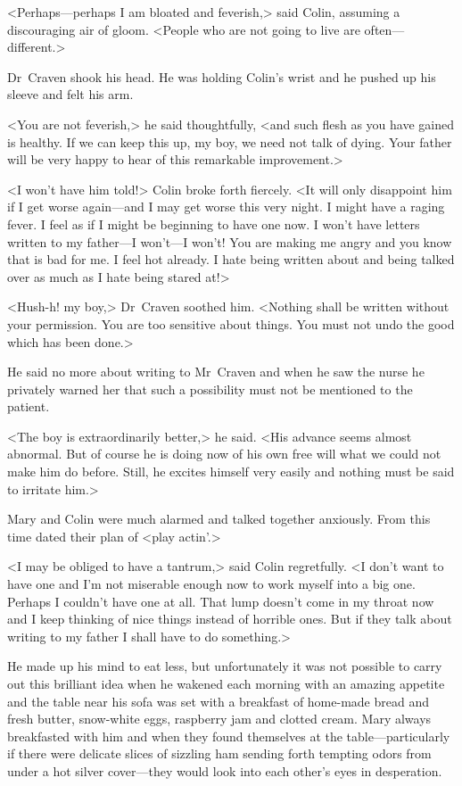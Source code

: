 <Perhaps—perhaps I am bloated and feverish,> said Colin, assuming a discouraging air of gloom. <People who are not going to live are often—different.>

Dr~Craven shook his head. He was holding Colin's wrist and he pushed up his sleeve and felt his arm.

<You are not feverish,> he said thoughtfully, <and such flesh as you have gained is healthy. If we can keep this up, my boy, we need not talk of dying. Your father will be very happy to hear of this remarkable improvement.>

<I won't have him told!> Colin broke forth fiercely. <It will only disappoint him if I get worse again—and I may get worse this very night. I might have a raging fever. I feel as if I might be beginning to have one now. I won't have letters written to my father—I won't—I won't! You are making me angry and you know that is bad for me. I feel hot already. I hate being written about and being talked over as much as I hate being stared at!>

<Hush-h! my boy,> Dr~Craven soothed him. <Nothing shall be written without your permission. You are too sensitive about things. You must not undo the good which has been done.>

He said no more about writing to Mr~Craven and when he saw the nurse he privately warned her that such a possibility must not be mentioned to the patient.

<The boy is extraordinarily better,> he said. <His advance seems almost abnormal. But of course he is doing now of his own free will what we could not make him do before. Still, he excites himself very easily and nothing must be said to irritate him.>

Mary and Colin were much alarmed and talked together anxiously. From this time dated their plan of <play actin'.>

<I may be obliged to have a tantrum,> said Colin regretfully. <I don't want to have one and I'm not miserable enough now to work myself into a big one. Perhaps I couldn't have one at all. That lump doesn't come in my throat now and I keep thinking of nice things instead of horrible ones. But if they talk about writing to my father I shall have to do something.>

He made up his mind to eat less, but unfortunately it was not possible to carry out this brilliant idea when he wakened each morning with an amazing appetite and the table near his sofa was set with a breakfast of home-made bread and fresh butter, snow-white eggs, raspberry jam and clotted cream. Mary always breakfasted with him and when they found themselves at the table—particularly if there were delicate slices of sizzling ham sending forth tempting odors from under a hot silver cover—they would look into each other's eyes in desperation.

